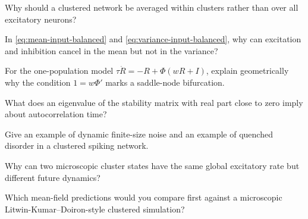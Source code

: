 \begin{conceptquestions}
  \item Why should a clustered network be averaged within clusters rather than over all excitatory neurons?
  \item In \cref{eq:mean-input-balanced} and \cref{eq:variance-input-balanced}, why can excitation and inhibition cancel in the mean but not in the variance?
  \item For the one-population model $\tau\dot R=-R+\Phi(wR+I)$, explain geometrically why the condition $1=w\Phi'$ marks a saddle-node bifurcation.
  \item What does an eigenvalue of the stability matrix with real part close to zero imply about autocorrelation time?
  \item Give an example of dynamic finite-size noise and an example of quenched disorder in a clustered spiking network.
  \item Why can two microscopic cluster states have the same global excitatory rate but different future dynamics?
  \item Which mean-field predictions would you compare first against a microscopic Litwin-Kumar--Doiron-style clustered simulation?
\end{conceptquestions}
